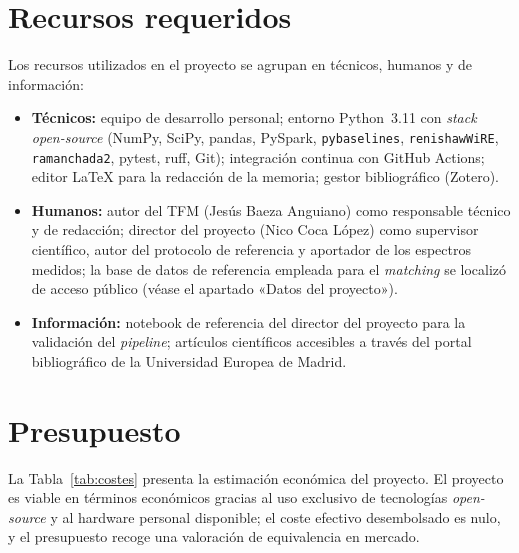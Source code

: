 \section{Recursos requeridos}

Los recursos utilizados en el proyecto se agrupan en técnicos, humanos y de información:

\begin{itemize}
    \item \textbf{Técnicos:} equipo de desarrollo personal; entorno Python~3.11 con \textit{stack} \textit{open-source} (NumPy, SciPy, pandas, PySpark, \texttt{pybaselines}, \texttt{renishawWiRE}, \texttt{ramanchada2}, pytest, ruff, Git); integración continua con GitHub Actions; editor LaTeX para la redacción de la memoria; gestor bibliográfico (Zotero).
    \item \textbf{Humanos:} autor del TFM (Jesús Baeza Anguiano) como responsable técnico y de redacción; director del proyecto (Nico Coca López) como supervisor científico, autor del protocolo de referencia y aportador de los espectros medidos; la base de datos de referencia empleada para el \textit{matching} se localizó de acceso público (véase el apartado «Datos del proyecto»).
    \item \textbf{Información:} notebook de referencia del director del proyecto para la validación del \textit{pipeline}; artículos científicos accesibles a través del portal bibliográfico de la Universidad Europea de Madrid.
\end{itemize}

\section{Presupuesto}

La Tabla~\ref{tab:costes} presenta la estimación económica del proyecto. El proyecto es viable en términos económicos gracias al uso exclusivo de tecnologías \textit{open-source} y al hardware personal disponible; el coste efectivo desembolsado es nulo, y el presupuesto recoge una valoración de equivalencia en mercado.


